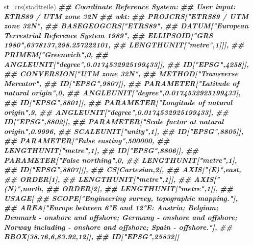 \documentclass[
  ngerman,
]{article}
\newenvironment{Shaded}{\begin{snugshade}}{\end{snugshade}}
\newcommand{\DocumentationTok}[1]{\textcolor[rgb]{0.56,0.35,0.01}{\textbf{\textit{#1}}}}
\newcommand{\FunctionTok}[1]{\textcolor[rgb]{0.00,0.00,0.00}{#1}}
\newcommand{\NormalTok}[1]{#1}
\begin{document}
\begin{Shaded}
\begin{Highlighting}[]
\FunctionTok{st\_crs}\NormalTok{(stadtteile)}
\DocumentationTok{\#\# Coordinate Reference System:}
\DocumentationTok{\#\#   User input: ETRS89 / UTM zone 32N }
\DocumentationTok{\#\#   wkt:}
\DocumentationTok{\#\# PROJCRS["ETRS89 / UTM zone 32N",}
\DocumentationTok{\#\#     BASEGEOGCRS["ETRS89",}
\DocumentationTok{\#\#         DATUM["European Terrestrial Reference System 1989",}
\DocumentationTok{\#\#             ELLIPSOID["GRS 1980",6378137,298.257222101,}
\DocumentationTok{\#\#                 LENGTHUNIT["metre",1]]],}
\DocumentationTok{\#\#         PRIMEM["Greenwich",0,}
\DocumentationTok{\#\#             ANGLEUNIT["degree",0.0174532925199433]],}
\DocumentationTok{\#\#         ID["EPSG",4258]],}
\DocumentationTok{\#\#     CONVERSION["UTM zone 32N",}
\DocumentationTok{\#\#         METHOD["Transverse Mercator",}
\DocumentationTok{\#\#             ID["EPSG",9807]],}
\DocumentationTok{\#\#         PARAMETER["Latitude of natural origin",0,}
\DocumentationTok{\#\#             ANGLEUNIT["degree",0.0174532925199433],}
\DocumentationTok{\#\#             ID["EPSG",8801]],}
\DocumentationTok{\#\#         PARAMETER["Longitude of natural origin",9,}
\DocumentationTok{\#\#             ANGLEUNIT["degree",0.0174532925199433],}
\DocumentationTok{\#\#             ID["EPSG",8802]],}
\DocumentationTok{\#\#         PARAMETER["Scale factor at natural origin",0.9996,}
\DocumentationTok{\#\#             SCALEUNIT["unity",1],}
\DocumentationTok{\#\#             ID["EPSG",8805]],}
\DocumentationTok{\#\#         PARAMETER["False easting",500000,}
\DocumentationTok{\#\#             LENGTHUNIT["metre",1],}
\DocumentationTok{\#\#             ID["EPSG",8806]],}
\DocumentationTok{\#\#         PARAMETER["False northing",0,}
\DocumentationTok{\#\#             LENGTHUNIT["metre",1],}
\DocumentationTok{\#\#             ID["EPSG",8807]]],}
\DocumentationTok{\#\#     CS[Cartesian,2],}
\DocumentationTok{\#\#         AXIS["(E)",east,}
\DocumentationTok{\#\#             ORDER[1],}
\DocumentationTok{\#\#             LENGTHUNIT["metre",1]],}
\DocumentationTok{\#\#         AXIS["(N)",north,}
\DocumentationTok{\#\#             ORDER[2],}
\DocumentationTok{\#\#             LENGTHUNIT["metre",1]],}
\DocumentationTok{\#\#     USAGE[}
\DocumentationTok{\#\#         SCOPE["Engineering survey, topographic mapping."],}
\DocumentationTok{\#\#         AREA["Europe between 6°E and 12°E: Austria; Belgium; Denmark {-} onshore and offshore; Germany {-} onshore and offshore; Norway including {-} onshore and offshore; Spain {-} offshore."],}
\DocumentationTok{\#\#         BBOX[38.76,6,83.92,12]],}
\DocumentationTok{\#\#     ID["EPSG",25832]]}
\end{Highlighting}
\end{Shaded}
\end{document}
